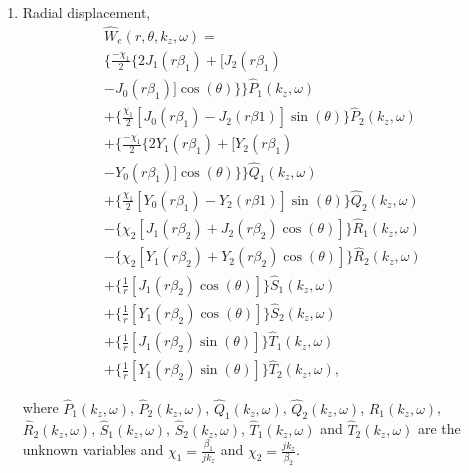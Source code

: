\documentclass[10pt]{asme2ej}
\begin{document}
\begin{enumerate}[label=\roman*]
    \item Radial displacement,
    \begin{multline}\label{Radial displacement 3d}
    \hat{W}_{e}(r,\theta,k_z,\omega) =\\ \Bigg\{\frac{-\chi_1}{2}\{2J_1(r\beta_1) + [J_2(r\beta_1)\\ - J_0(r\beta_1)]\cos(\theta)\}\Bigg\}\hat{P}_1(k_z,\omega)\\ + \Bigg\{\frac{\chi_1}{2}[J_0(r\beta_1) - J_2(r\beta1)]\sin(\theta)\Bigg\}\hat{P}_2(k_z,\omega)\\ + \Bigg\{\frac{-\chi_1}{2}\{2Y_1(r\beta_1) + [Y_2(r\beta_1)\\-Y_0(r\beta_1)]\cos(\theta)\}\Bigg\}\hat{Q}_1(k_z,\omega)\\ + \Bigg\{\frac{\chi_1}{2}[Y_0(r\beta_1)-Y_2(r\beta1)]\sin(\theta)\Bigg\}\hat{Q}_2(k_z,\omega)\\ - \Bigg\{\chi_2[J_1(r\beta_2)+J_2(r\beta_2)\cos(\theta)]\Bigg\}\hat{R}_1(k_z,\omega)\\ - \Bigg\{\chi_2[Y_1(r\beta_2) + Y_2(r\beta_2)\cos(\theta)]\Bigg\}\hat{R}_2(k_z,\omega)\\ + \Bigg\{\frac{1}{r}[J_1(r\beta_2)\cos(\theta)]\Bigg\}\hat{S}_1(k_z,\omega)\\ + \Bigg\{\frac{1}{r}[Y_1(r\beta_2)\cos(\theta)]\Bigg\}\hat{S}_2(k_z,\omega)\\ + \Bigg\{\frac{1}{r}[J_1(r\beta_2)\sin(\theta)]\Bigg\}\hat{T}_1(k_z,\omega)\\ + \Bigg\{\frac{1}{r}[Y_1(r\beta_2)\sin(\theta)]\Bigg\}\hat{T}_2(k_z,\omega),
    \end{multline}
	
    where $\hat{P}_1(k_z,\omega)$, $\hat{P}_2(k_z,\omega)$, $\hat{Q}_1(k_z,\omega)$, $\hat{Q}_2(k_z,\omega)$, $\hat{R}_1(k_z,\omega)$, $\hat{R}_2(k_z,\omega)$, $\hat{S}_1(k_z,\omega)$, $\hat{S}_2(k_z,\omega)$, $\hat{T}_1(k_z,\omega)$ and $\hat{T}_2(k_z,\omega)$ are the unknown variables and $\chi_{1} = \frac{\beta_1}{jk_z}$ and $\chi_{2} =\frac{jk_z}{\beta_2}$.
	

\end{enumerate}
\end{document}
